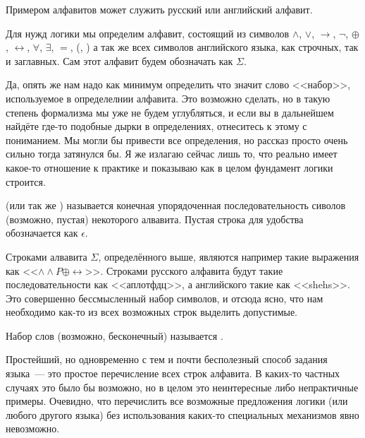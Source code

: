 \begin{example}
Примером алфавитов может служить русский или английский алфавит.
\end{example}

\begin{example}
Для нужд логики мы определим алфавит, состоящий из символов $\land$, $\lor$, $\to$, $\neg$, $\oplus$, $\leftrightarrow$, $\forall$, $\exists$, $=$, (, ) а так же всех символов английского языка, как строчных, так и заглавных. Сам этот алфавит будем обозначать как $\Sigma$.
\end{example}

Да, опять же нам надо как минимум определить что значит слово <<набор>>, используемое в определелнии алфавита. Это возможно сделать, но в такую степень формализма мы уже не будем углубляться, и если вы в дальнейшем найдёте где-то подобные дырки в определениях, отнеситесь к этому с пониманием. Мы могли бы привести все определения, но рассказ просто очень сильно тогда затянулся бы. Я же излагаю сейчас лишь то, что реально имеет какое-то отношение к практике и показываю как в целом фундамент логики строится.

\begin{definition}
 (или так же ) называется конечная упорядоченная последовательность сиволов (возможно, пустая) некоторого алвавита. Пустая строка для удобства обозначается как $\epsilon$.
\end{definition}

Строками алвавита $\Sigma$, определённого выше, являются например такие выражения как <<$\land\land P\oplus\leftrightarrow$>>. Строками русского алфавита будут такие последовательности как <<аплотфдц>>, а английского такие как <<shehs>>. Это совершенно бессмысленный набор символов, и отсюда ясно, что нам необходимо как-то из всех возможных строк выделить допустимые.

\begin{definition}
Набор слов (возможно, бесконечный) называется .
\end{definition}

Простейший, но одновременно с тем и почти бесполезный способ задания языка~--- это простое перечисление всех строк алфавита. В каких-то частных случаях это было бы возможно, но в целом это неинтересные либо непрактичные примеры. Очевидно, что перечислить все возможные предложения логики (или любого другого языка) без использования каких-то специальных механизмов явно невозможно.

